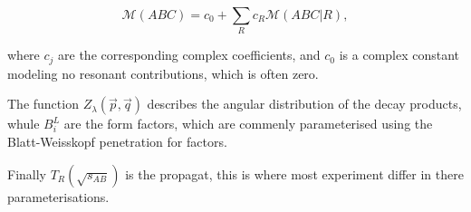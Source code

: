 \begin{equation}
    \mathcal{M}\left( ABC \right) = c_{0} + \sum_{R} c_{R} \mathcal{M} \left( ABC | R \right),
\end{equation}

where $c_{j}$ are the corresponding complex coefficients, and $c_{0}$ is a complex constant modeling no resonant contributions, which is often zero.

The function $Z_{\lambda}\left( \vec{p}, \vec{q} \right)$ describes the angular distribution of the decay products, whule $B_{i}^{L}$ are the form factors, which are commenly parameterised using the Blatt-Weisskopf penetration for factors.

Finally $T_{R}\left( \sqrt{s_{AB}} \right)$ is the propagat, this is where most experiment differ in there parameterisations.